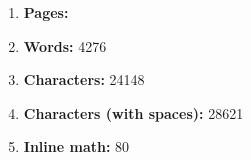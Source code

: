 \begin{enumerate}[itemsep = 0.1 pt]

      \item{
            \textbf{Pages:} 
            }




      \item{
            \textbf{Words:} 4276
            }

      \item{
            \textbf{Characters:} 24148
            }
      \item{
            \textbf{Characters (with spaces):} 28621
            }
      \item{
            \textbf{Inline math:} 80
            }

\end{enumerate}